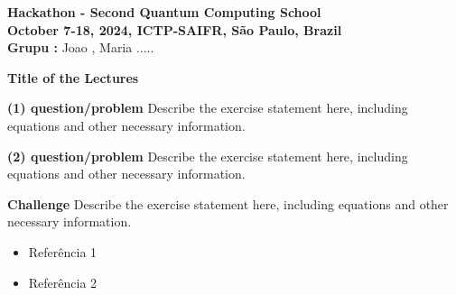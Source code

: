 \documentclass[a4paper,12pt]{article}
\begin{document}
\begin{flushleft}
    \textbf{Hackathon - Second Quantum Computing School}\\
    \textbf{October 7-18, 2024, ICTP-SAIFR, São Paulo, Brazil}\\
    \textbf{Grupu :} Joao , Maria .....

\end{flushleft}

\vspace{0.5cm}


\large{\textbf{Title of the Lectures}}

\vspace{1cm}

\textbf{(1) question/problem}
\newline
\newline
Describe the exercise statement here, including equations and other necessary information.

\vspace{1cm}

\textbf{(2) question/problem}
\newline
\newline
Describe the exercise statement here, including equations and other necessary information.

\vspace{1cm}
\textbf{ Challenge }
\newline
\newline
Describe the exercise statement here, including equations and other necessary information.



\vspace{0.5cm}

\begin{itemize}
    \item Referência 1
    \item Referência 2
\end{itemize}
\end{document}
